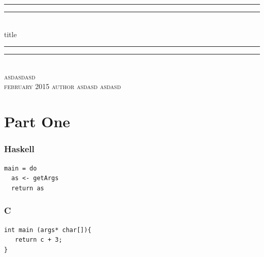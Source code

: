 \documentclass[11pt,a4paper]{article}
\begin{document}
\newcommand*{\titleGP}[6]{\begingroup
\centering
\vspace*{\baselineskip}
\rule{\textwidth}{1.6pt}\vspace*{-\baselineskip}\vspace*{2pt}
\rule{\textwidth}{0.4pt}\\[\baselineskip]
{\Huge {#1}} %
\rule{\textwidth}{0.4pt}\vspace*{-\baselineskip}\vspace{3.2pt}
\rule{\textwidth}{1.6pt}\\[\baselineskip]
\scshape
{\Large {#2}\\[\baselineskip] %
{#3}} %
\vspace*{2\baselineskip}
{\huge {#4}} %
\vspace*{2\baselineskip}
{#6} %
\vfill
{\Large {#5}} %
\endgroup}

\titleGP{title}{asdasdasd}{february 2015}{author}{asdasd}{asdasd}
\restoregeometry
{}


\tableofcontents


\part{Part One}


\section{Haskell}

\lstset{language=haskell}
\begin{lstlisting}[frame=single]
main = do
  as <- getArgs
  return as
\end{lstlisting}

\section{C}

\lstset{language=C}
\begin{lstlisting}[frame=none]
int main (args* char[]){
   return c + 3;
}
\end{lstlisting}

\end{document}
